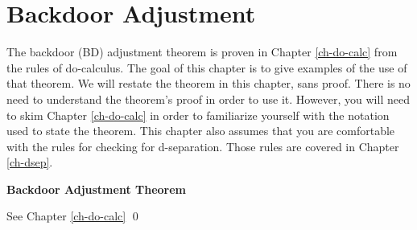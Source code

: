\chapter{Backdoor Adjustment}
\label{ch-bdoor}

The backdoor (BD) adjustment
theorem is proven in 
Chapter \ref{ch-do-calc}
from the rules of do-calculus.
The goal 
of this chapter is
to give examples
of the use of that
theorem.
We will restate
the theorem in this chapter,
sans proof.
There is no need
to understand the
theorem's
proof in order to use it.
However, you
will
need to skim Chapter \ref{ch-do-calc}
in order to familiarize 
yourself with
the notation used to state the 
theorem.
This chapter also assumes
that you are comfortable 
with the  rules 
for checking for d-separation. Those rules
are covered in Chapter \ref{ch-dsep}.



\bdoordef
\begin{claim} {\bf Backdoor Adjustment
 Theorem}

\bdoorclaim
\end{claim}
\proof 
See Chapter \ref{ch-do-calc}
\qed


